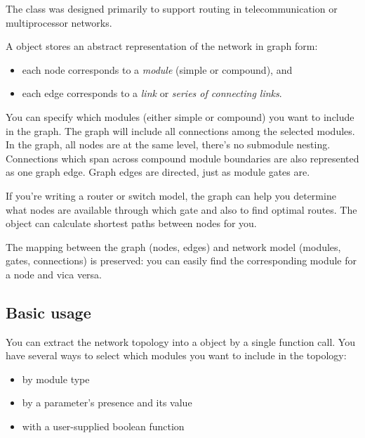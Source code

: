 The  class was designed primarily to support
routing in telecommunication or multiprocessor
networks.

A  object stores an abstract representation of the
network in graph form:
\begin{itemize}
  \item{each  node corresponds to a \textit{module}
    (simple or compound), and}
  \item{each  edge corresponds to a \textit{link} or
    \textit{series of connecting links}.}
\end{itemize}

You can specify which modules (either simple or compound) you want to
include in the graph. The graph will include all connections among the
selected modules. In the graph, all nodes are at the same level,
there's no submodule nesting.  Connections which span across compound
module boundaries are also represented as one graph edge. Graph edges
are directed, just as module gates are.


If you're writing a router or switch model, the 
graph can help you determine what nodes are available through which
gate and also to find optimal routes. The
 object can calculate shortest paths between nodes for you.

The mapping between the graph (nodes, edges) and network model
(modules, gates, connections) is preserved: you can easily find
the corresponding module for a  node and vica versa.





\subsection{Basic usage}

You can extract the network topology into a 
object by a single function call. You have several ways to select
which modules you want to include in the topology:
\begin{itemize}
  \item{by module type}
  \item{by a parameter's presence and its value}
  \item{with a user-supplied boolean function}
\end{itemize}

